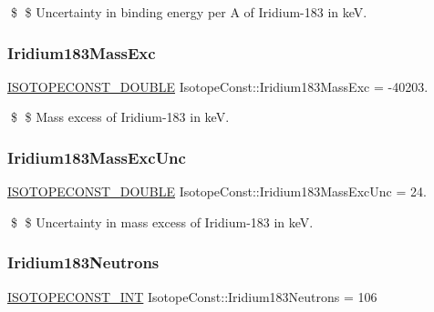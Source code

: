 \$ \$ Uncertainty in binding energy per A of Iridium-\/183 in keV. \mbox{\label{group___isotope_const-_iridium-_ir183_gac775fbcd2e4a701e4ab6c0ac3c50a3a5}} 
\subsubsection{\texorpdfstring{Iridium183\+Mass\+Exc}{Iridium183MassExc}}
{\footnotesize\ttfamily \mbox{\hyperlink{group___isotope_const-_macros_ga8f45a7272ce02c0b4c65c44636ed719a}{I\+S\+O\+T\+O\+P\+E\+C\+O\+N\+S\+T\+\_\+\+D\+O\+U\+B\+LE}} Isotope\+Const\+::\+Iridium183\+Mass\+Exc = -\/40203.}

\$ \$ Mass excess of Iridium-\/183 in keV. \mbox{\label{group___isotope_const-_iridium-_ir183_gaf0f98b094ef2c2aa3fc425aa7f5fa321}} 
\subsubsection{\texorpdfstring{Iridium183\+Mass\+Exc\+Unc}{Iridium183MassExcUnc}}
{\footnotesize\ttfamily \mbox{\hyperlink{group___isotope_const-_macros_ga8f45a7272ce02c0b4c65c44636ed719a}{I\+S\+O\+T\+O\+P\+E\+C\+O\+N\+S\+T\+\_\+\+D\+O\+U\+B\+LE}} Isotope\+Const\+::\+Iridium183\+Mass\+Exc\+Unc = 24.}

\$ \$ Uncertainty in mass excess of Iridium-\/183 in keV. \mbox{\label{group___isotope_const-_iridium-_ir183_gadeab1f71143fd3c436f3b4bcf8632ced}} 
\subsubsection{\texorpdfstring{Iridium183\+Neutrons}{Iridium183Neutrons}}
{\footnotesize\ttfamily \mbox{\hyperlink{group___isotope_const-_macros_ga5f18360b3e99483a35c32d789e62621c}{I\+S\+O\+T\+O\+P\+E\+C\+O\+N\+S\+T\+\_\+\+I\+NT}} Isotope\+Const\+::\+Iridium183\+Neutrons = 106}

